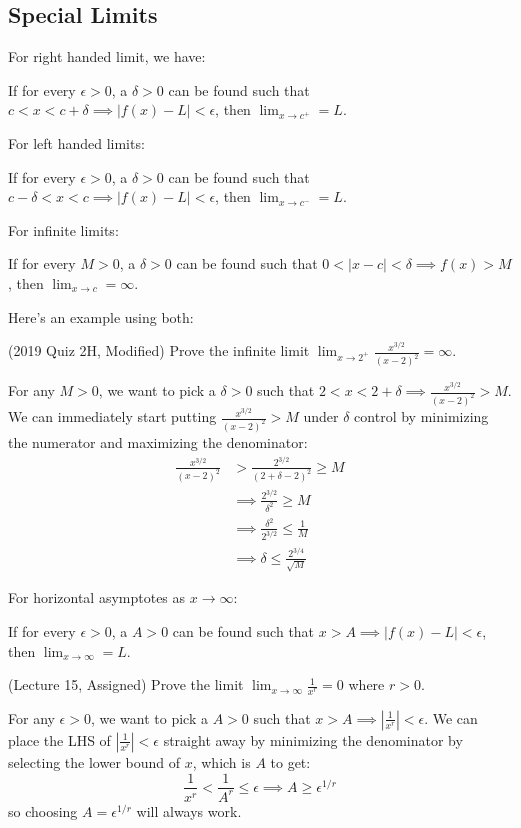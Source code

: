 \documentclass{article}
\begin{document}
\subsection{Special Limits}
For right handed limit, we have:
\begin{definition}
    If for every $\epsilon>0$, a $\delta>0$ can be found such that $c<x<c+\delta \implies |f(x)-L|<\epsilon$, then $\displaystyle\lim_{x\to c^+} = L$.
\end{definition}
For left handed limits:
\begin{definition}
    If for every $\epsilon>0$, a $\delta>0$ can be found such that $c-\delta<x<c \implies |f(x)-L|<\epsilon$, then $\displaystyle\lim_{x\to c^-} = L$.
\end{definition}
For infinite limits:
\begin{definition}
    If for every $M>0$, a $\delta>0$ can be found such that $0<|x-c|<\delta \implies f(x) > M$, then $\displaystyle \lim_{x\to c} = \infty$.
\end{definition}
Here's an example using both:
\begin{example}
    (2019 Quiz 2H, Modified) Prove the infinite limit $\displaystyle \lim_{x\to 2^+}\frac{x^{3/2}}{(x-2)^2} = \infty$.
    \vspace{2mm}

    For any $M > 0$, we want to pick a $\delta > 0$ such that $2<x<2+\delta \implies \frac{x^{3/2}}{(x-2)^2}>M$. We can immediately start putting $\displaystyle \frac{x^{3/2}}{(x-2)^2}>M$ under $\delta$ control by minimizing the numerator and maximizing the denominator:
    \begin{align}
        \frac{x^{3/2}}{(x-2)^2} &> \frac{2^{3/2}}{(2+\delta-2)^2} \ge M \\
        &\implies \frac{2^{3/2}}{\delta^2} \ge M \\ 
        &\implies \frac{\delta^2}{2^{3/2}} \le \frac{1}{M} \\ 
        &\implies \delta \le \frac{2^{3/4}}{\sqrt{M}}
        \label{eq:}
    \end{align}
\end{example}
For horizontal asymptotes as $x\to\infty$:
\begin{theorem}
    If for every $\epsilon>0$, a $A>0$ can be found such that $x>A \implies |f(x)-L|<\epsilon$, then $\displaystyle \lim_{x\to \infty} = L$.
\end{theorem}
\begin{example}
    (Lecture 15, Assigned) Prove the limit $\displaystyle \lim_{x\to \infty} \frac{1}{x^r} = 0$ where $r>0$.
    \vspace{2mm}
    
    For any $\epsilon > 0$, we want to pick a $A > 0$ such that $x>A \implies \left|\frac{1}{x^r}\right|<\epsilon$. We can place the LHS of $\left|\frac{1}{x^r}\right|<\epsilon$ straight away by minimizing the denominator by selecting the lower bound of $x$, which is $A$ to get:
    \begin{equation}
        \frac{1}{x^r} < \frac{1}{A^r} \le \epsilon \implies A \ge \epsilon^{1/r}
        \label{eq:}
    \end{equation}
    so choosing $A = \epsilon^{1/r}$ will always work.
\end{example}
\end{document}
